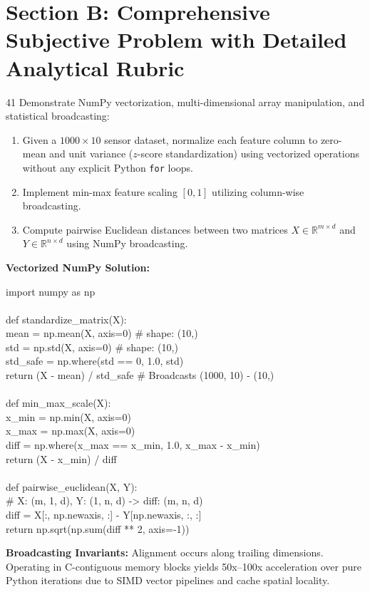 \newpage
\section{Section B: Comprehensive Subjective Problem with Detailed Analytical Rubric}

\begin{subjectiveq}{4}{1}
Demonstrate NumPy vectorization, multi-dimensional array manipulation, and statistical broadcasting:
\begin{enumerate}[label=(\alph*)]
    \item Given a $1000 \times 10$ sensor dataset, normalize each feature column to zero-mean and unit variance ($z$-score standardization) using vectorized operations without any explicit Python \texttt{for} loops.
    \item Implement min-max feature scaling $[0, 1]$ utilizing column-wise broadcasting.
    \item Compute pairwise Euclidean distances between two matrices $X \in \mathbb{R}^{m \times d}$ and $Y \in \mathbb{R}^{n \times d}$ using NumPy broadcasting.
\end{enumerate}
\end{subjectiveq}

\begin{solbox}
\textbf{Vectorized NumPy Solution:}
\begin{pycode}
import numpy as np\\
~\\
def standardize\_matrix(X):\\
\quad mean = np.mean(X, axis=0) \quad \# shape: (10,)\\
\quad std = np.std(X, axis=0) \quad \quad \# shape: (10,)\\
\quad std\_safe = np.where(std == 0, 1.0, std)\\
\quad return (X - mean) / std\_safe \quad \# Broadcasts (1000, 10) - (10,)\\
~\\
def min\_max\_scale(X):\\
\quad x\_min = np.min(X, axis=0)\\
\quad x\_max = np.max(X, axis=0)\\
\quad diff = np.where(x\_max == x\_min, 1.0, x\_max - x\_min)\\
\quad return (X - x\_min) / diff\\
~\\
def pairwise\_euclidean(X, Y):\\
\quad \# X: (m, 1, d), Y: (1, n, d) -> diff: (m, n, d)\\
\quad diff = X[:, np.newaxis, :] - Y[np.newaxis, :, :]\\
\quad return np.sqrt(np.sum(diff ** 2, axis=-1))
\end{pycode}
\textbf{Broadcasting Invariants:} Alignment occurs along trailing dimensions. Operating in C-contiguous memory blocks yields 50x--100x acceleration over pure Python iterations due to SIMD vector pipelines and cache spatial locality.
\end{solbox}

